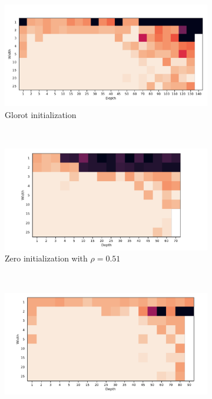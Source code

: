\begin{figure}
  \centering
  \begin{subfigure}[b]{0.2\textwidth}
        \includegraphics[width=\textwidth]{img/moons_grid/acc-sep-up-0-0001.pdf}
        \caption{Glorot initialization}
        \label{fig:moons_glorot_rho}
    \end{subfigure}
    ~ %
      \centering
    \begin{subfigure}[b]{0.2\textwidth}
        \includegraphics[width=\textwidth]{img/moons_grid/acc-sep-up-0-0001-zero.pdf}
        \caption{Zero initialization with $\rho = 0.51$}
        \label{fig:moons_zeros_rho}
    \end{subfigure}
    ~ %
    \centering
    \begin{subfigure}[b]{0.2\textwidth}
        \includegraphics[width=\textwidth]{img/moons_grid/acc-sep-up-0-0001-nm-0.pdf}

\end{subfigure}
\end{figure}
